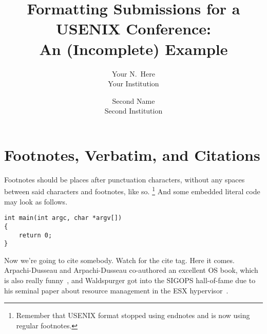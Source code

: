 

\date{}

\title{\Large \bf Formatting Submissions for a USENIX Conference:\\
  An (Incomplete) Example}

\author{
{\rm Your N.\ Here}\\
Your Institution
\and
{\rm Second Name}\\
Second Institution
} %

\maketitle







\section{Footnotes, Verbatim, and Citations}

Footnotes should be places after punctuation characters, without any
spaces between said characters and footnotes, like so.%
\footnote{Remember that USENIX format stopped using endnotes and is
  now using regular footnotes.} And some embedded literal code may
look as follows.

\begin{verbatim}
int main(int argc, char *argv[]) 
{
    return 0;
}
\end{verbatim}

Now we're going to cite somebody. Watch for the cite tag. Here it
comes. Arpachi-Dusseau and Arpachi-Dusseau co-authored an excellent OS
book, which is also really funny~\cite{arpachiDusseau18:osbook}, and
Waldspurger got into the SIGOPS hall-of-fame due to his seminal paper
about resource management in the ESX hypervisor~\cite{waldspurger02,SLMDB}.


